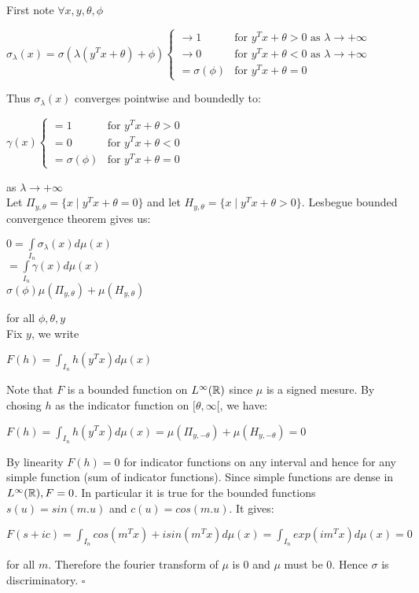 \documentclass[12pt, a4paper]{article}
\newenvironment{proof}{{\sc Proof:}}{\hfill $\square$}
\begin{document}
  \begin{proof}
    First note $\forall x,y,\theta, \phi$ 
\begin{center}
  $\sigma_\lambda(x) = \sigma(\lambda (y^Tx + \theta) + \phi)
  \begin{cases}
    \to 1 &\text{for $y^Tx+\theta > 0$ as $\lambda \to +\infty$}\\
    \to 0 &\text{for $y^Tx+\theta < 0$ as $\lambda \to +\infty$}\\
    =\sigma(\phi) & \text{for $y^Tx+\theta = 0$}
  \end{cases}$
\end{center}
Thus $\sigma_\lambda(x)$ converges pointwise and boundedly to:

\begin{center}
  $\gamma(x)
  \begin{cases}
    =1 &\text{for $y^Tx+\theta > 0$}\\
    =0 &\text{for $y^Tx+\theta < 0$}\\
    =\sigma(\phi) & \text{for $y^Tx+\theta = 0$}
  \end{cases}$
\end{center}
as $\lambda \to +\infty$\\
\sv
Let $\Pi_{y,\theta} = \{x \mid y^Tx+\theta = 0\}$ and let $H_{y,\theta} = \{x \mid y^Tx + \theta > 0\}$. Lesbegue bounded convergence theorem gives us:
\begin{center}
  $0 = \int\limits_{I_n}\sigma_\lambda(x)d\mu(x)$\\
  $ = \int\limits_{I_n} \gamma(x)d\mu(x)$\\
  $\sigma(\phi)\mu(\Pi_{y,\theta}) + \mu(H_{y,\theta})$
\end{center}
for all $\phi, \theta, y$\\
\sv
Fix $y$, we write
\begin{center}
  $F(h) = \int_{I_n}h(y^Tx)d\mu(x)$
\end{center}
Note that $F$ is a bounded function on $L^\infty(\mathbb{R})$ since $\mu$ is a signed mesure. By chosing  $h$ as the indicator function on $[\theta, \infty[$, we have:
\begin{center}
  $F(h) = \int_{I_n} h(y^Tx) d\mu(x) = \mu(\Pi_{y,-\theta}) + \mu(H_{y,-\theta}) = 0$
\end{center}
By linearity $F(h) = 0$ for indicator functions on any interval and hence for any simple function (sum of indicator functions). Since simple functions are dense in $L^{\infty}(\mathbb{R}), F = 0$.
In particular it is true for the bounded functions $s(u) = sin(m.u)$ and $c(u) = cos(m.u)$. It gives:
\begin{center}
  $F(s+ic) = \int_{I_n} cos(m^Tx) + i sin(m^Tx) d\mu(x) = \int_{I_n} exp(im^Tx)d\mu(x) = 0$
\end{center}
for all $m$. Therefore the fourier transform of $\mu$ is 0 and $\mu$ must be 0. Hence $\sigma$ is discriminatory.
  \end{proof}\\
\end{document}
